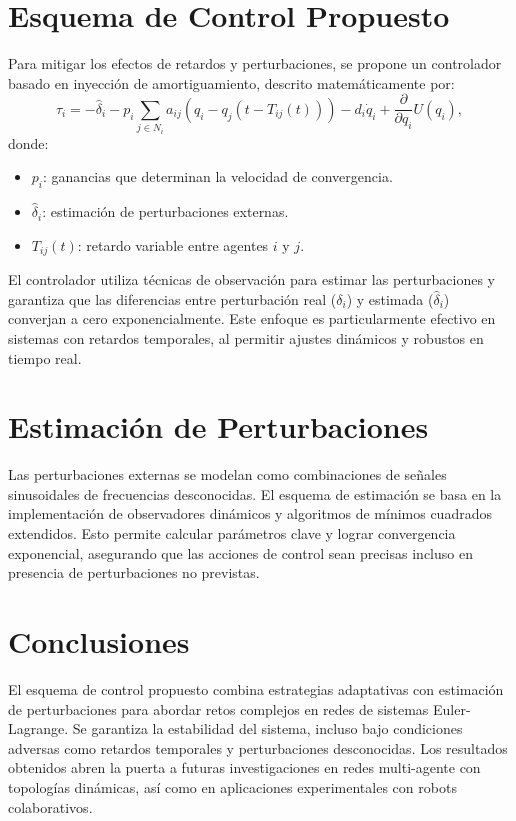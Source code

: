 \documentclass[conference]{IEEEtran}
\begin{document}
\section*{Esquema de Control Propuesto}

Para mitigar los efectos de retardos y perturbaciones, se propone un controlador basado en inyección de amortiguamiento, descrito matemáticamente por:
\[
\tau_i = -\hat{\delta}_i - p_i \sum_{j \in N_i} a_{ij} (q_i - q_j(t - T_{ij}(t))) - d_i\dot{q}_i + \frac{\partial}{\partial q_i} U(q_i),
\]
donde:
\begin{itemize}
    \item \( p_i \): ganancias que determinan la velocidad de convergencia.
    \item \( \hat{\delta}_i \): estimación de perturbaciones externas.
    \item \( T_{ij}(t) \): retardo variable entre agentes \( i \) y \( j \).
\end{itemize}

El controlador utiliza técnicas de observación para estimar las perturbaciones y garantiza que las diferencias entre perturbación real (\( \delta_i \)) y estimada (\( \hat{\delta}_i \)) converjan a cero exponencialmente. Este enfoque es particularmente efectivo en sistemas con retardos temporales, al permitir ajustes dinámicos y robustos en tiempo real.



\section*{Estimación de Perturbaciones}

Las perturbaciones externas se modelan como combinaciones de señales sinusoidales de frecuencias desconocidas. El esquema de estimación se basa en la implementación de observadores dinámicos y algoritmos de mínimos cuadrados extendidos. Esto permite calcular parámetros clave y lograr convergencia exponencial, asegurando que las acciones de control sean precisas incluso en presencia de perturbaciones no previstas.

\section*{Conclusiones}

El esquema de control propuesto combina estrategias adaptativas con estimación de perturbaciones para abordar retos complejos en redes de sistemas Euler-Lagrange. Se garantiza la estabilidad del sistema, incluso bajo condiciones adversas como retardos temporales y perturbaciones desconocidas. Los resultados obtenidos abren la puerta a futuras investigaciones en redes multi-agente con topologías dinámicas, así como en aplicaciones experimentales con robots colaborativos.
\end{document}
